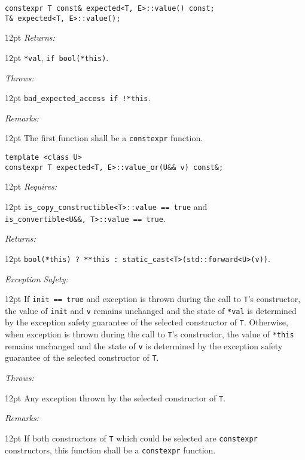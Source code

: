 \documentclass[a4paper,10pt]{article}
\newcommand{\cpp}[1]{\lstinline{#1}}
\newcommand{\wordingItem}[1]{\noindent\textit{#1:}}
\newenvironment{wordingTextItem}[1]{\wordingItem{#1}\vspace{7pt}\noindent\begin{adjustwidth}{12pt}{}}{\vspace{7pt}\end{adjustwidth}}
\newenvironment{wordingPara}{\begin{adjustwidth}{12pt}{}}{\end{adjustwidth}}
\begin{document}
\begin{lstlisting}[xleftmargin=0pt]
constexpr T const& expected<T, E>::value() const;
T& expected<T, E>::value(); 
\end{lstlisting}
\begin{wordingPara}
\begin{wordingTextItem}{Returns}
\cpp{*val}, \cpp{if bool(*this)}.
\end{wordingTextItem}
\begin{wordingTextItem}{Throws}
\cpp{bad_expected_access if !*this}.
\end{wordingTextItem}
\begin{wordingTextItem}{Remarks}
The first function shall be a \cpp{constexpr} function.
\end{wordingTextItem}
\end{wordingPara}

\begin{lstlisting}[xleftmargin=0pt]
template <class U>
constexpr T expected<T, E>::value_or(U&& v) const&; 
\end{lstlisting}
\begin{wordingPara}
\begin{wordingTextItem}{Requires}
\cpp{is_copy_constructible<T>::value == true} and \\
\cpp{is_convertible<U&&, T>::value == true}.
\end{wordingTextItem}
\begin{wordingTextItem}{Returns}
\cpp{bool(*this) ? **this : static_cast<T>(std::forward<U>(v))}.
\end{wordingTextItem}
\begin{wordingTextItem}{Exception Safety}
If \cpp{init == true} and exception is thrown during the call to \cpp{T}'s constructor, the value of \cpp{init} and \cpp{v} remains unchanged and the state of \cpp{*val} is determined by the exception safety guarantee of the selected constructor of \cpp{T}. Otherwise, when exception is thrown during the call to \cpp{T}'s constructor, the value of \cpp{*this} remains unchanged and the state of \cpp{v} is determined by the exception safety guarantee of the selected constructor of \cpp{T}.
\end{wordingTextItem}
\begin{wordingTextItem}{Throws}
Any exception thrown by the selected constructor of \cpp{T}.
\end{wordingTextItem}
\begin{wordingTextItem}{Remarks}
If both constructors of \cpp{T} which could be selected are \cpp{constexpr} constructors, this function shall be a \cpp{constexpr} function.
\end{wordingTextItem}
\end{wordingPara}
\end{document}
